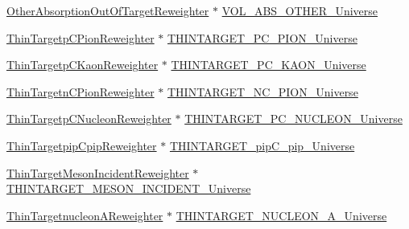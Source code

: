 \begin{DoxyCompactItemize}
\item 
\hyperlink{class_neutrino_flux_reweight_1_1_other_absorption_out_of_target_reweighter}{Other\-Absorption\-Out\-Of\-Target\-Reweighter} $\ast$ \hyperlink{class_neutrino_flux_reweight_1_1_reweight_driver_aa1f1b8ea148bd3fff48b157ab415a024}{V\-O\-L\-\_\-\-A\-B\-S\-\_\-\-O\-T\-H\-E\-R\-\_\-\-Universe}
\item 
\hyperlink{class_neutrino_flux_reweight_1_1_thin_targetp_c_pion_reweighter}{Thin\-Targetp\-C\-Pion\-Reweighter} $\ast$ \hyperlink{class_neutrino_flux_reweight_1_1_reweight_driver_aceea3b1dd8305e7d37c0b661840d52a7}{T\-H\-I\-N\-T\-A\-R\-G\-E\-T\-\_\-\-P\-C\-\_\-\-P\-I\-O\-N\-\_\-\-Universe}
\item 
\hyperlink{class_neutrino_flux_reweight_1_1_thin_targetp_c_kaon_reweighter}{Thin\-Targetp\-C\-Kaon\-Reweighter} $\ast$ \hyperlink{class_neutrino_flux_reweight_1_1_reweight_driver_aacd236a73fd4e708a0e90a1ca9edcb76}{T\-H\-I\-N\-T\-A\-R\-G\-E\-T\-\_\-\-P\-C\-\_\-\-K\-A\-O\-N\-\_\-\-Universe}
\item 
\hyperlink{class_neutrino_flux_reweight_1_1_thin_targetn_c_pion_reweighter}{Thin\-Targetn\-C\-Pion\-Reweighter} $\ast$ \hyperlink{class_neutrino_flux_reweight_1_1_reweight_driver_aaa94d62c4e0a72f462df4b09399593f9}{T\-H\-I\-N\-T\-A\-R\-G\-E\-T\-\_\-\-N\-C\-\_\-\-P\-I\-O\-N\-\_\-\-Universe}
\item 
\hyperlink{class_neutrino_flux_reweight_1_1_thin_targetp_c_nucleon_reweighter}{Thin\-Targetp\-C\-Nucleon\-Reweighter} $\ast$ \hyperlink{class_neutrino_flux_reweight_1_1_reweight_driver_a86849016485121f8bb72d32e0f851379}{T\-H\-I\-N\-T\-A\-R\-G\-E\-T\-\_\-\-P\-C\-\_\-\-N\-U\-C\-L\-E\-O\-N\-\_\-\-Universe}
\item 
\hyperlink{class_neutrino_flux_reweight_1_1_thin_targetpip_cpip_reweighter}{Thin\-Targetpip\-Cpip\-Reweighter} $\ast$ \hyperlink{class_neutrino_flux_reweight_1_1_reweight_driver_aee325ba668d837970619500d1fc081eb}{T\-H\-I\-N\-T\-A\-R\-G\-E\-T\-\_\-pip\-C\-\_\-pip\-\_\-\-Universe}
\item 
\hyperlink{class_neutrino_flux_reweight_1_1_thin_target_meson_incident_reweighter}{Thin\-Target\-Meson\-Incident\-Reweighter} $\ast$ \hyperlink{class_neutrino_flux_reweight_1_1_reweight_driver_abc7d7800e76704e573cc04c4d73a5363}{T\-H\-I\-N\-T\-A\-R\-G\-E\-T\-\_\-\-M\-E\-S\-O\-N\-\_\-\-I\-N\-C\-I\-D\-E\-N\-T\-\_\-\-Universe}
\item 
\hyperlink{class_neutrino_flux_reweight_1_1_thin_targetnucleon_a_reweighter}{Thin\-Targetnucleon\-A\-Reweighter} $\ast$ \hyperlink{class_neutrino_flux_reweight_1_1_reweight_driver_aebe0e33616f2581af478e60fe6618959}{T\-H\-I\-N\-T\-A\-R\-G\-E\-T\-\_\-\-N\-U\-C\-L\-E\-O\-N\-\_\-\-A\-\_\-\-Universe}

\end{DoxyCompactItemize}
